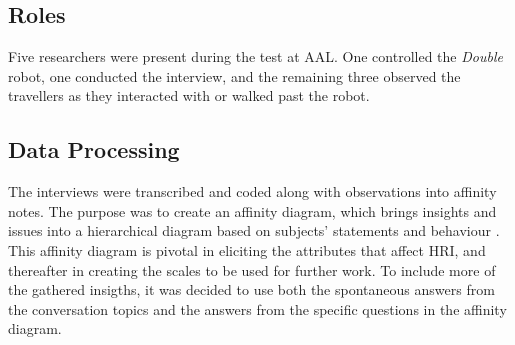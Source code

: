 \subsection{Roles}
Five researchers were present during the test at AAL. One controlled the \textit{Double} robot, one conducted the interview, and the remaining three observed the travellers as they interacted with or walked past the robot. 

\subsection{Data Processing}
The interviews were transcribed and coded along with observations into affinity notes. The purpose was to create an affinity diagram, which brings insights and issues into a hierarchical diagram based on subjects' statements and behaviour \cite{Wendell2005}. This affinity diagram is pivotal in eliciting the attributes that affect HRI, and thereafter in creating the scales to be used for further work. To include more of the gathered insigths, it was decided to use both the spontaneous answers from the conversation topics and the answers from the specific questions in the affinity diagram. 




